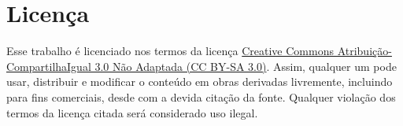 \chapter*{Licença}

Esse trabalho é licenciado nos termos da licença \href{https://creativecommons.org/licenses/by-sa/3.0/deed.pt}{Creative Commons Atribuição-CompartilhaIgual 3.0 Não Adaptada (CC BY-SA 3.0)}.
Assim, qualquer um pode usar, distribuir e modificar o conteúdo em obras derivadas livremente, incluindo para fins comerciais, desde com a devida citação da fonte.
Qualquer violação dos termos da licença citada será considerado uso ilegal.
